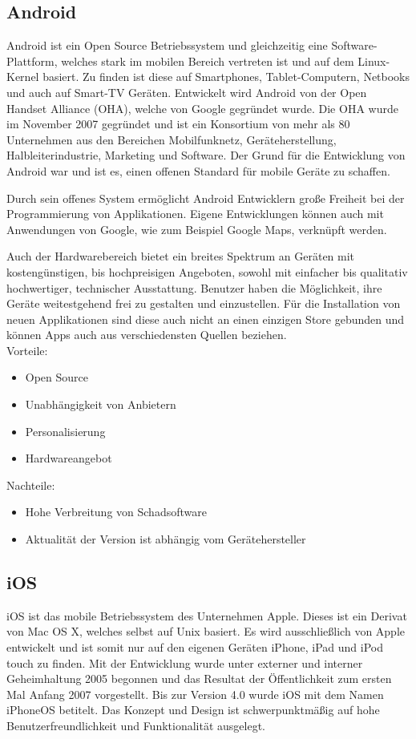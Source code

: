 \subsection{Android}
Android ist ein Open Source Betriebssystem und gleichzeitig eine Software-Plattform, welches stark im mobilen Bereich vertreten ist und auf dem Linux-Kernel basiert. Zu finden ist diese auf Smartphones, Tablet-Computern, Netbooks und auch auf Smart-TV Geräten. \citep{android_overview} Entwickelt wird Android von der Open Handset Alliance (OHA), welche von Google gegründet wurde. Die OHA wurde im November 2007 gegründet und ist ein Konsortium von mehr als 80 Unternehmen aus den Bereichen Mobilfunknetz, Geräteherstellung, Halbleiterindustrie, Marketing und Software. \citep{alliance_members} Der Grund für die Entwicklung von Android war und ist es, einen offenen Standard für mobile Geräte zu schaffen. \citep{alliance_overview}

Durch sein offenes System ermöglicht Android Entwicklern große Freiheit bei der Programmierung von Applikationen. Eigene Entwicklungen können auch mit Anwendungen von Google, wie zum Beispiel Google Maps, verknüpft werden.

Auch der Hardwarebereich bietet ein breites Spektrum an Geräten mit kostengünstigen, bis hochpreisigen Angeboten, sowohl mit einfacher bis qualitativ hochwertiger, technischer Ausstattung. Benutzer haben die Möglichkeit, ihre Geräte weitestgehend frei zu gestalten und einzustellen. Für die Installation von neuen Applikationen sind diese auch nicht an einen einzigen Store gebunden und können Apps auch aus verschiedensten Quellen beziehen.
\\

Vorteile:
\begin{itemize}
	\item Open Source
	\item Unabhängigkeit von Anbietern
	\item Personalisierung
	\item Hardwareangebot
\end{itemize}

Nachteile:
\begin{itemize}
	\item Hohe Verbreitung von Schadsoftware
	\item Aktualität der Version ist abhängig vom Gerätehersteller
\end{itemize}

\subsection{iOS}
iOS ist das mobile Betriebssystem des Unternehmen Apple. Dieses ist ein Derivat von Mac OS X, welches selbst auf Unix basiert. Es wird ausschließlich von Apple entwickelt und ist somit nur auf den eigenen Geräten iPhone, iPad und iPod touch zu finden. Mit der Entwicklung wurde unter externer und interner Geheimhaltung 2005 begonnen und das Resultat der Öffentlichkeit zum ersten Mal Anfang 2007 vorgestellt. Bis zur Version 4.0 wurde iOS mit dem Namen iPhoneOS betitelt. Das Konzept und Design ist schwerpunktmäßig auf hohe Benutzerfreundlichkeit und Funktionalität ausgelegt. 

